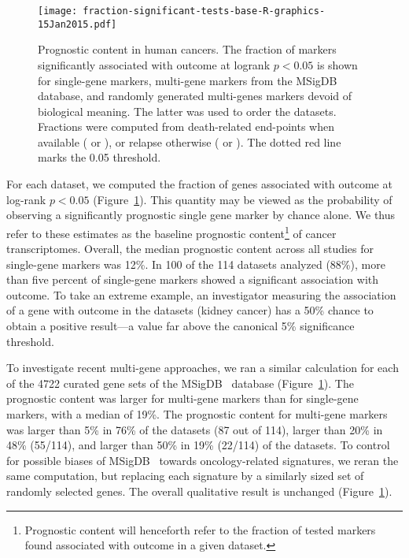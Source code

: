 \begin{figure}%
  \texttt{[image: fraction-significant-tests-base-R-graphics-15Jan2015.pdf]}
  \caption[Prognostic content in human cancers]{Prognostic content in human
    cancers.  The fraction of markers significantly associated with outcome at
    logrank $p<0.05$ is shown for single-gene markers, multi-gene markers from
    the \mbox{MSigDB } database, and randomly generated
    multi-genes markers devoid of biological meaning.  The latter was used to
    order the datasets. Fractions were computed from death-related end-points
    when available ( or ), or relapse otherwise
    ( or ). The dotted red line marks the 0.05
    threshold.}
  \label{fig:prognostic-fraction}%
\end{figure}

For each dataset, we computed the fraction of genes associated with outcome at
log-rank $p<0.05$ (Figure~\ref{fig:prognostic-fraction}).  This quantity may be
viewed as the probability of observing a significantly prognostic single gene
marker by chance alone.  We thus refer to these estimates as the baseline
prognostic content\footnote{Prognostic content will henceforth refer to the
  fraction of tested markers found associated with outcome in a given dataset.}
of cancer transcriptomes.  Overall, the median prognostic content across all
studies for single-gene markers was 12\%.  In 100 of the 114 datasets
analyzed (88\%), more than five percent of single-gene markers showed a
significant association with outcome.  %
To take an extreme example, an investigator measuring the association of a gene
with outcome in the  datasets (kidney cancer) has a 50\% chance
to obtain a positive result---a value far above the canonical 5\% significance
threshold.

To investigate recent multi-gene approaches, we ran a similar calculation for
each of the 4722 curated gene sets of the \mbox{MSigDB }
database\cite{liberzon_molecular_2011} (Figure~\ref{fig:prognostic-fraction}).
The prognostic content was larger for multi-gene markers than for single-gene
markers, with a median of 19\%.  The prognostic content for multi-gene markers
was larger than 5\% in 76\% of the datasets (87 out of 114), larger than 20\% in
48\% (55/114), and larger than 50\% in 19\% (22/114) of the datasets.  To
control for possible biases of \mbox{MSigDB } towards
oncology-related signatures, we reran the same computation, but replacing each
signature by a similarly sized set of randomly selected genes.  The overall
qualitative result is unchanged (Figure~\ref{fig:prognostic-fraction}).

